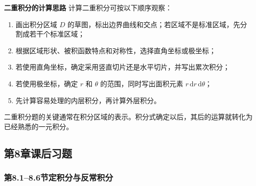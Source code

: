 \documentclass[fontset=fandol]{ctexart}
\newenvironment{custom}[1]{\par\noindent\textbf{#1}\quad}{\par\vspace{0.8em}}
\newcommand{\dd}{\mathrm{d}}
\begin{document}
\begin{custom}{二重积分的计算思路}
计算二重积分可按以下顺序观察：
\begin{enumerate}
\item 画出积分区域 $D$ 的草图，标出边界曲线和交点；若区域不是标准区域，先分割成若干个标准区域；
\item 根据区域形状、被积函数特点和对称性，选择直角坐标或极坐标；
\item 若使用直角坐标，确定采用竖直切片还是水平切片，并写出累次积分；
\item 若使用极坐标，确定 $r$ 和 $\theta$ 的范围，同时写出面积元素 $r\,\dd r\,\dd\theta$；
\item 先计算容易处理的内层积分，再计算外层积分。
\end{enumerate}
二重积分题的关键通常在积分区域的表示。积分式确定以后，其后的运算就转化为已经熟悉的一元积分。
\end{custom}

\iffalse


\clearpage
\subsection*{第8章课后习题}

\subsubsection*{第8.1--8.6节\quad 定积分与反常积分}
\end{document}
